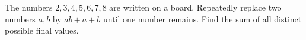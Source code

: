 The numbers $2,3,4,5,6,7,8$ are written on a board. Repeatedly replace two numbers $a,b$ by $ab+a+b$ until one number remains. Find the sum of all distinct possible final values.
